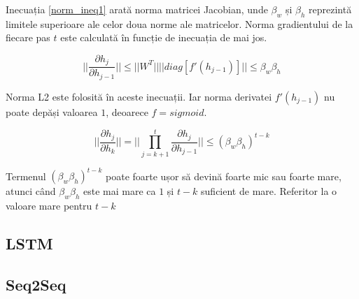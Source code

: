 Inecuația \ref{norm_ineq1} arată norma matricei Jacobian, unde $\beta_w$ și $\beta_h$ reprezintă limitele superioare ale celor doua norme ale matricelor. Norma gradientului de la fiecare pas $t$ este calculată în funcție de inecuația de mai jos.

\begin{equation}
	|| \frac{\partial h_j}{\partial h_{j-1}}|| \leq || W^T || || diag[f'(h_{j-1})]|| \leq \beta_w\beta_h
	\label{norm_ineq1}
\end{equation}

Norma L2 este folosită în aceste inecuații. Iar norma derivatei $f'(h_{j-1})$ nu poate depăși valoarea $1$, deoarece $f=sigmoid$.

\begin{equation}
	|| \frac{\partial h_j}{\partial h_k}|| = || \prod_{j=k+1}^{t} \frac{\partial h_j}{\partial h_{j-1}} || \leq (\beta_w\beta_h)^{t-k}
\end{equation}

Termenul $(\beta_w\beta_h)^{t-k}$ poate foarte ușor să devină foarte mic sau foarte mare, atunci când $\beta_w\beta_h$ este mai mare ca $1$ și $t-k$ suficient de mare. Referitor la o valoare mare pentru $t-k$

\subsection{LSTM}



\subsection{Seq2Seq}
